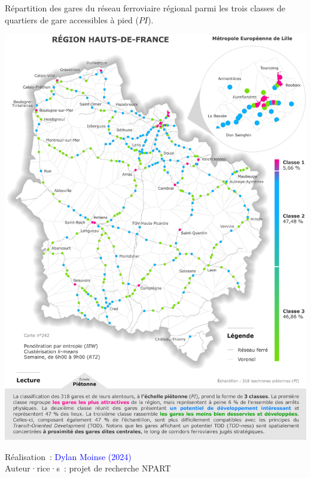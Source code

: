 \begin{refsegment}
    \begin{carte}[h!]\vspace*{4pt}
        \caption{Répartition des gares du réseau ferroviaire régional parmi les trois classes de quartiers de gare accessibles à pied (\(PI\)).}
        \label{fig-chap6:classification-gares-pieton}
        \centerline{\includegraphics[width=1\columnwidth]{src/Figures/Chap-6/FR_NPART_Carte_Classification_PI.jpg}}
        \vspace{5pt}
        \begin{flushright}\scriptsize{
        Réalisation~: \textcolor{blue}{Dylan Moinse (2024)}
        \\
        Auteur·rice·s~: projet de recherche \acrshort{NPART}
        }\end{flushright}
    \end{carte}


\end{refsegment}
